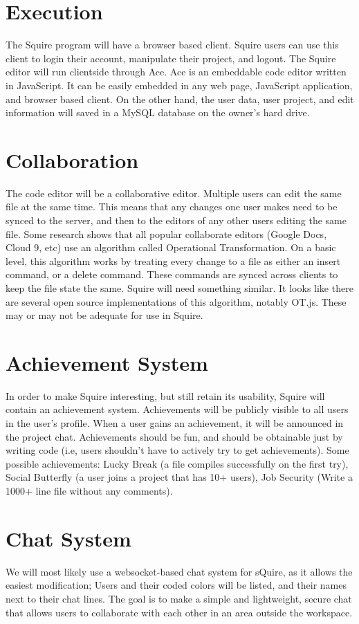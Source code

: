 \documentclass[11pt]{report}
\begin{document}
\section{Execution}
    The Squire program will have a browser based client. Squire users can use this client to login their account, manipulate their project, and logout. The Squire editor will run clientside through Ace. Ace is an embeddable code editor written in JavaScript. It can be easily embedded in any web page, JavaScript application, and browser based client. On the other hand, the user data, user project, and edit information will saved in a MySQL database on the owner's hard drive.  

\section{Collaboration}
    The code editor will be a collaborative editor. Multiple users can edit the same file at the same time. This means that any changes one user makes need to be synced to the server, and then to the editors of any other users editing the same file. Some research shows that all popular collaborate editors (Google Docs, Cloud 9, etc) use an algorithm called Operational Transformation. On a basic level, this algorithm works by treating every change to a file as either an insert command, or a delete command. These commands are synced across clients to keep the file state the same. Squire will need something similar. It looks like there are several open source implementations of this algorithm, notably OT.js. These may or may not be adequate for use in Squire.
 
\section{Achievement System}
    In order to make Squire interesting, but still retain its usability, Squire will contain an achievement system. Achievements will be publicly visible to all users in the user's profile. When a user gains an achievement, it will be announced in the project chat. Achievements should be fun, and should be obtainable just by writing code (i.e, users shouldn’t have to actively try to get achievements). Some possible achievements: Lucky Break (a file compiles successfully on the first try), Social Butterfly (a user joins a project that has 10+ users), Job Security (Write a 1000+ line file without any comments).
    
\section{Chat System}
    We will most likely use a websocket-based chat system for sQuire, as it allows the easiest modification; Users and their coded colors will be listed, and their names next to their chat lines. The goal is to make a simple and lightweight, secure chat that allows users to collaborate with each other in an area outside the workspace.
\end{document}

